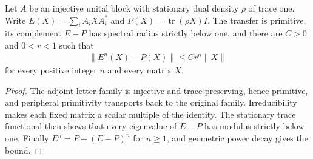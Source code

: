 \begin{lemma}
    \label{lem:uncle_injective_transfer_decay}
    \leanok
    Let $A$ be an injective unital block with stationary dual density
    $\rho$ of trace one. Write $E(X)=\sum_iA_iXA_i^*$ and
    $P(X)=\operatorname{tr}(\rho X)I$. The transfer is primitive, its
    complement $E-P$ has spectral radius strictly below one, and there
    are $C>0$ and $0<r<1$ such that
    \begin{align}
        \lVert E^n(X)-P(X)\rVert\le Cr^n\lVert X\rVert
    \end{align}
    for every positive integer $n$ and every matrix $X$.
\end{lemma}
\begin{proof}
    \leanok
    The adjoint letter family is injective and trace preserving, hence
    primitive, and peripheral primitivity transports back to the original
    family. Irreducibility makes each fixed matrix a scalar multiple of
    the identity. The stationary trace functional then shows that every
    eigenvalue of $E-P$ has modulus strictly below one. Finally
    $E^n=P+(E-P)^n$ for $n\ge1$, and geometric power decay gives the bound.
\end{proof}

